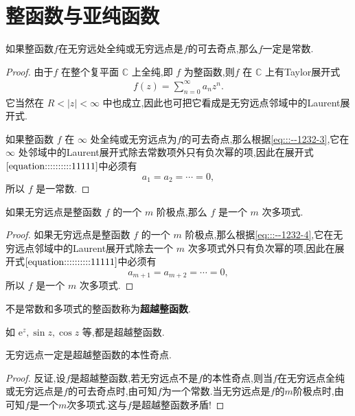 \documentclass[../../main.tex]{subfiles}
\begin{document}
\section{整函数与亚纯函数}

\begin{theorem}\label{theorem:定理5.3.1}
如果整函数$f$在无穷远处全纯或无穷远点是$f$的可去奇点,那么$f$一定是常数.
\end{theorem}
\begin{proof}
由于\( f \) 在整个复平面 \( \mathbb{C} \) 上全纯,即 \( f \) 为整函数,则\( f \) 在 \( \mathbb{C} \) 上有Taylor展开式
\begin{align}
f(z) = \sum_{n = 0}^{\infty} a_n z^n. \label{equation::::::::::11111}
\end{align}
它当然在 \( R < |z| < \infty \) 中也成立,因此也可把它看成是无穷远点邻域中的Laurent展开式.

如果整函数 \( f \) 在 \( \infty \) 处全纯或无穷远点为$f$的可去奇点,那么根据\eqref{eq:::--1232-3},它在 \( \infty \) 处邻域中的Laurent展开式除去常数项外只有负次幂的项,因此在展开式\(\eqref{equation::::::::::11111}\)中必须有
\[
a_1 = a_2 = \cdots = 0,
\]
所以 \( f \) 是一常数.

\end{proof}

\begin{theorem}\label{theorem:定理5.3.2}
如果无穷远点是整函数 \( f \) 的一个 \( m \) 阶极点,那么 \( f \) 是一个 \( m \) 次多项式.
\end{theorem}
\begin{proof}
如果无穷远点是整函数 \( f \) 的一个 \( m \) 阶极点,那么根据\eqref{eq:::--1232-4},它在无穷远点邻域中的Laurent展开式除去一个 \( m \) 次多项式外只有负次幂的项,因此在展开式\(\eqref{equation::::::::::11111}\)中必须有
\[
a_{m + 1} = a_{m + 2} = \cdots = 0,
\]
所以 \( f \) 是一个 \( m \) 次多项式.

\end{proof}

\begin{definition}
不是常数和多项式的整函数称为\textbf{超越整函数}.
\end{definition}
\begin{remark}
如 \( \mathrm{e}^z,\sin z,\cos z \) 等,都是超越整函数.
\end{remark}

\begin{proposition}
无穷远点一定是超越整函数的本性奇点.
\end{proposition}
\begin{proof}
反证,设$f$是超越整函数,若无穷远点不是$f$的本性奇点,则当$f$在无穷远点全纯或无穷远点是$f$的可去奇点时,由可知$f$为一个常数.当无穷远点是$f$的$m$阶极点时,由可知$f$是一个$m$次多项式.这与$f$是超越整函数矛盾!

\end{proof}
\end{document}
